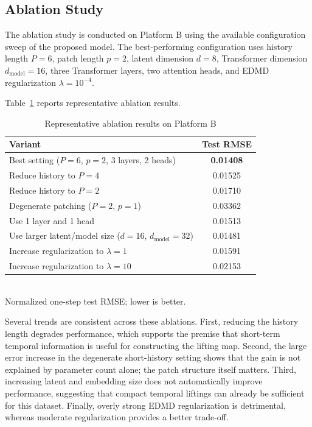 \documentclass[journal]{IEEEtran}
\begin{document}
\subsection{Ablation Study}

The ablation study is conducted on Platform B using the available configuration sweep of the proposed model. The best-performing configuration uses history length $P=6$, patch length $p=2$, latent dimension $d=8$, Transformer dimension $d_{\mathrm{model}}=16$, three Transformer layers, two attention heads, and EDMD regularization $\lambda=10^{-4}$.

Table~\ref{tab:ablation_platform_b} reports representative ablation results.

\begin{table}[!t]
\renewcommand{\arraystretch}{1.2}
\caption{Representative ablation results on Platform B}
\label{tab:ablation_platform_b}
\centering
\begin{tabular}{>{\raggedright\arraybackslash}p{}c}
\hline\hline
Variant & Test RMSE \\
\hline
Best setting ($P=6$, $p=2$, 3 layers, 2 heads) & \textbf{0.01408} \\
Reduce history to $P=4$ & 0.01525 \\
Reduce history to $P=2$ & 0.01710 \\
Degenerate patching ($P=2$, $p=1$) & 0.03362 \\
Use 1 layer and 1 head & 0.01513 \\
Use larger latent/model size ($d=16$, $d_{\mathrm{model}}=32$) & 0.01481 \\
Increase regularization to $\lambda=1$ & 0.01591 \\
Increase regularization to $\lambda=10$ & 0.02153 \\
\hline\hline
\end{tabular}
\\[2pt]
{\footnotesize Normalized one-step test RMSE; lower is better.}
\end{table}

Several trends are consistent across these ablations. First, reducing the history length degrades performance, which supports the premise that short-term temporal information is useful for constructing the lifting map. Second, the large error increase in the degenerate short-history setting shows that the gain is not explained by parameter count alone; the patch structure itself matters. Third, increasing latent and embedding size does not automatically improve performance, suggesting that compact temporal liftings can already be sufficient for this dataset. Finally, overly strong EDMD regularization is detrimental, whereas moderate regularization provides a better trade-off.
\end{document}
